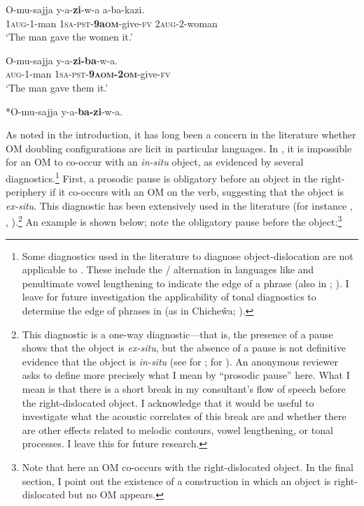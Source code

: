 \documentclass[output=paper
,newtxmath
,modfonts
,nonflat]{langsci/langscibook}
\begin{document}
\ex\label{ex:ranero:9b}
\gll O-mu-sajja    y-a-\textbf{zi}{}-w-a            a-ba-kazi.\\
1\textsc{aug}{}-1-man 1\textsc{sa}{}-\textsc{pst}{}-\textbf{9a\textsc{om}}{}-give-\textsc{fv} 2\textsc{aug}{}-2-woman\\
\glt ‘The man gave the women it.’

\ex\label{ex:ranero:9c}
\gll O-mu-sajja  y-a-\textbf{zi-ba}{}-w-a. \\       
\textsc{aug-}1-man \textsc{1sa-pst}{}-\textbf{\textsc{9aom-2om}}{}-give-\textsc{fv}\\
\glt ‘The man gave them it.’

\ex\label{ex:ranero:9d}*O-mu-sajja y-a-\textbf{ba-zi}{}-w-a.
\z
\z

As noted in the introduction, it has long been a concern in the  literature whether OM doubling configurations are licit in particular languages. In , it is impossible for an OM to co-occur with an \textit{in-situ} object, as evidenced by several diagnostics.\footnote{Some diagnostics used in the  literature to diagnose object-dislocation are not applicable to . These include the / alternation in languages like  \citep{Zeller2015} and penultimate vowel lengthening to indicate the edge of a phrase (also in ; \citealt{ChengDowning2009}). I leave for future investigation the applicability of tonal diagnostics to determine the edge of phrases in  (as in Chiche\^wa; \citealt{Bresnan1987}).} First, a prosodic pause is obligatory before an object in the right-periphery if it co-occurs with an OM on the verb, suggesting that the object is \textit{ex-situ}. This diagnostic has been extensively used in the  literature (for instance \citealt{Cecchetto1999}, \citealt{Cruschina2011}, \citealt{anagnostopouloutoappear}).\footnote{This diagnostic is a one-way diagnostic—that is, the presence of a pause shows that the object is \textit{ex-situ}, but the absence of a pause is not definitive evidence that the object is \textit{in-situ} (see \citealt{dierckstoappear} for ; \citealt{diercks2015} for ). An anonymous reviewer asks to define more precisely what I mean by “prosodic pause” here. What I mean is that there is a short break in my consultant’s flow of speech before the right-dislocated object. I acknowledge that it would be useful to investigate what the acoustic correlates of this break are and whether there are other effects related to melodic contours, vowel lengthening, or tonal processes. I leave this for future research.} An example is shown below; note the obligatory pause before the object:\footnote{Note that here an OM co-occurs with the right-dislocated object. In the final section, I point out the existence of a construction in which an object is right-dislocated but no OM appears.}
\end{document}
